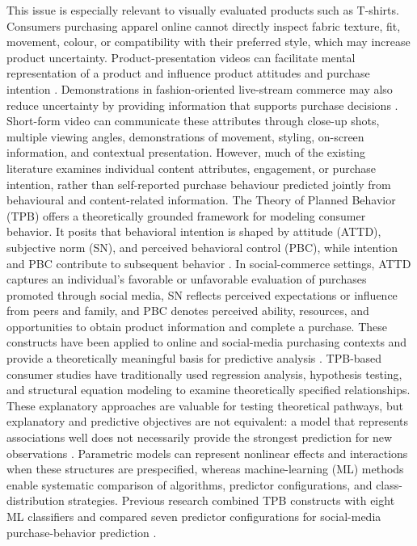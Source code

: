 \documentclass[jtaer,article,submit,moreauthors]{Definitions/mdpi}
\begin{document}
This issue is especially relevant to visually evaluated products such as
T-shirts. Consumers purchasing apparel online cannot directly inspect fabric
texture, fit, movement, colour, or compatibility with their preferred style,
which may increase product uncertainty. Product-presentation videos can
facilitate mental representation of a product and influence product attitudes
and purchase intention \cite{Orus2017}. Demonstrations in fashion-oriented
live-stream commerce may also reduce uncertainty by providing information that
supports purchase decisions \cite{Hwang2023}. Short-form video can communicate
these attributes through close-up shots, multiple viewing angles,
demonstrations of movement, styling, on-screen information, and contextual
presentation. However, much of the existing literature examines individual
content attributes, engagement, or purchase intention, rather than
self-reported purchase behaviour predicted jointly from behavioural and
content-related information.
%
The Theory of Planned Behavior (TPB) offers a theoretically grounded
framework for modeling consumer behavior. It posits that behavioral
intention is shaped by attitude (ATTD), subjective norm (SN), and perceived
behavioral control (PBC), while intention and PBC contribute to subsequent
behavior \cite{Ajzen1991}. In social-commerce settings, ATTD captures an
individual's favorable or unfavorable evaluation of purchases promoted
through social media, SN reflects perceived expectations or influence from
peers and family, and PBC denotes perceived ability, resources, and
opportunities to obtain product information and complete a purchase. These
constructs have been applied to online and social-media purchasing contexts
and provide a theoretically meaningful basis for predictive analysis
\cite{Azad2023}.
TPB-based consumer studies have traditionally used regression analysis,
hypothesis testing, and structural equation modeling to examine theoretically
specified relationships. These explanatory approaches are valuable for
testing theoretical pathways, but explanatory and predictive objectives are
not equivalent: a model that represents associations well does not necessarily
provide the strongest prediction for new observations
\cite{Shmueli2010}. Parametric models can represent nonlinear effects and
interactions when these structures are prespecified, whereas machine-learning
(ML) methods enable systematic comparison of algorithms, predictor
configurations, and class-distribution strategies. Previous research combined
TPB constructs with eight ML classifiers and compared seven predictor
configurations for social-media purchase-behavior prediction
\cite{Azad2023}.
\end{document}
